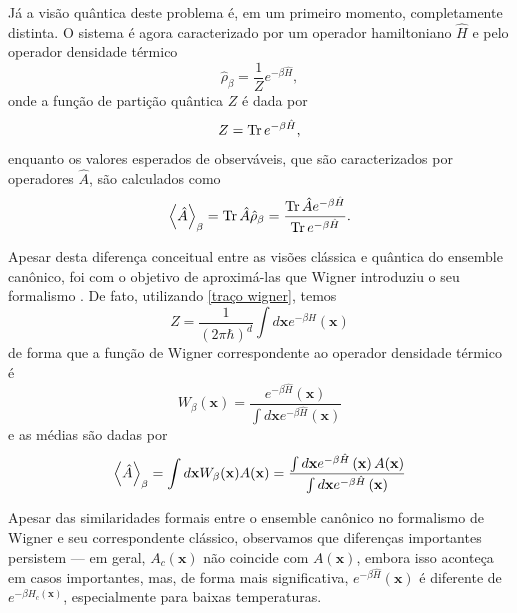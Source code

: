 \documentclass[
	12pt,
	oneside,			%
	a4paper,			%
	english,			%
	brazil				%
	]{abntex2}
\theoremstyle{definition}
\begin{document}
Já a visão quântica deste problema é, em um primeiro momento, completamente distinta. O sistema é agora caracterizado por um operador hamiltoniano $\hat{H}$ e pelo operador densidade térmico
\begin{equation}
    \hat{\rho}_\beta = \frac{1}{Z} e^{ -\beta \hat{H} },
\end{equation}
onde a função de partição quântica $Z$ é dada por
\begin{equation}
    Z = \Tr e^{ -\beta \hat{H} },
\end{equation}
enquanto os valores esperados de observáveis, que são caracterizados por operadores $\hat{A}$, são calculados como
\begin{equation}
\label{valor esperado quantico}
    \ev{\hat{A}}_\beta = \Tr \hat{A} \hat{\rho}_\beta = \frac{\Tr \hat{A} e^{ -\beta \hat{H} } }{\Tr e^{ -\beta \hat{H} }}.
\end{equation}

Apesar desta diferença conceitual entre as visões clássica e quântica do ensemble canônico, foi com o objetivo de aproximá-las que Wigner introduziu o seu formalismo \cite{PhysRev.40.749}. De fato, utilizando \eqref{traço wigner}, temos
\begin{equation}
\label{partição wigner}
    Z = \frac{1}{\left( 2\pi \hbar \right)^d} \int d\mathbf{x} e^{-\beta \hat{H}} \left( \mathbf{x} \right)
\end{equation}
de forma que a função de Wigner correspondente ao operador densidade térmico é
\begin{equation}
\label{wigner termico}
    W_\beta \left(\mathbf{x}\right) = \frac{e^{-\beta \hat{H}} \left( \mathbf{x} \right)}{\int d\mathbf{x} e^{-\beta \hat{H}} \left( \mathbf{x} \right)}
\end{equation}
e as médias são dadas por
\begin{equation}
\label{valor esperado wigner 2}
    \ev{\hat{A}}_\beta = \int d \mathbf{x} W_\beta(\mathbf{x}) A(\mathbf{x}) = \frac{\int d \mathbf{x} e^{-\beta \hat{H}} \left( \mathbf{x} \right) A(\mathbf{x})}{\int d\mathbf{x} e^{-\beta \hat{H}} \left( \mathbf{x} \right)}
\end{equation}

Apesar das similaridades formais entre o ensemble canônico no formalismo de Wigner e seu correspondente clássico, observamos que diferenças importantes persistem — em geral, $A_c(\mathbf{x})$ não coincide com $A(\mathbf{x})$, embora isso aconteça em casos importantes, mas, de forma mais significativa, $e^{-\beta \hat{H}}(\mathbf{x})$ é diferente de $e^{-\beta H_c(\mathbf{x})}$, especialmente para baixas temperaturas.
\end{document}
